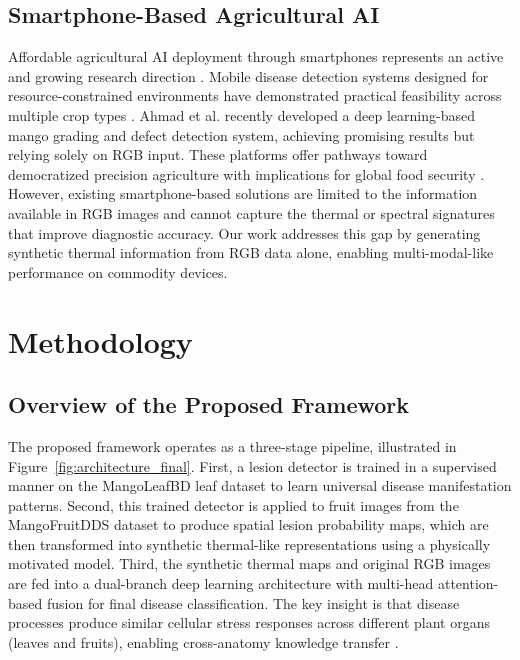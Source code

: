\documentclass[utf8]{FrontiersinHarvard} %
\begin{document}
\subsection{Smartphone-Based Agricultural AI}
Affordable agricultural AI deployment through smartphones represents an active and growing research direction \cite{pongnumkul2015,coulibaly2022}. Mobile disease detection systems designed for resource-constrained environments have demonstrated practical feasibility across multiple crop types \cite{li2020,picon2022}. Ahmad et al. \cite{ahmad2023} recently developed a deep learning-based mango grading and defect detection system, achieving promising results but relying solely on RGB input. These platforms offer pathways toward democratized precision agriculture with implications for global food security \cite{liu2020_yolo}. However, existing smartphone-based solutions are limited to the information available in RGB images and cannot capture the thermal or spectral signatures that improve diagnostic accuracy. Our work addresses this gap by generating synthetic thermal information from RGB data alone, enabling multi-modal-like performance on commodity devices.

\section{Methodology}
\label{sec:methodology}

\subsection{Overview of the Proposed Framework}
The proposed framework operates as a three-stage pipeline, illustrated in Figure~\ref{fig:architecture_final}. First, a lesion detector is trained in a supervised manner on the MangoLeafBD leaf dataset to learn universal disease manifestation patterns. Second, this trained detector is applied to fruit images from the MangoFruitDDS dataset to produce spatial lesion probability maps, which are then transformed into synthetic thermal-like representations using a physically motivated model. Third, the synthetic thermal maps and original RGB images are fed into a dual-branch deep learning architecture with multi-head attention-based fusion for final disease classification. The key insight is that disease processes produce similar cellular stress responses across different plant organs (leaves and fruits), enabling cross-anatomy knowledge transfer \cite{bock2010,savary2019}.
\end{document}
